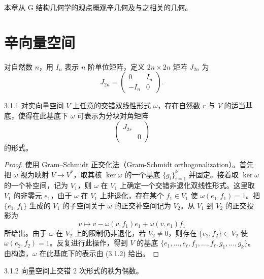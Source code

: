 本章从 G 结构几何学的观点概观辛几何及与之相关的几何。

\section{辛向量空间}

对自然数 $n$，用 $I_n$ 表示 $n$ 阶单位矩阵，定义 $2n\times 2n$ 矩阵 $J_{2n}$ 为
\begin{equation}
  J_{2n}=\begin{pmatrix}0 & I_n\\ -I_n & 0\end{pmatrix}.
  \tag{3.1.1}
\end{equation}

\begin{proposition*}{3.1.1}
  对实向量空间 $V$ 上任意的交错双线性形式 $\omega$，存在自然数 $r$ 与 $V$ 的适当基底，使得在此基底下 $\omega$ 可表示为分块对角矩阵
  \begin{equation}
    \begin{pmatrix} J_{2r} & \\ & 0\end{pmatrix}
    \tag{3.1.2}
  \end{equation}
  的形式。
\end{proposition*}

\begin{proof}
  使用 Gram--Schmidt 正交化法（Gram-Schmidt orthogonalization）。首先把 $\omega$ 视为映射 $V\to V^*$，取其核 $\ker\omega$ 的一个基底 $\{g_i\}_{i=1}^{k}$ 并固定。接着取 $\ker\omega$ 的一个补空间，记为 $V_1$，则 $\omega$ 在 $V_1$ 上确定一个交错非退化双线性形式。这里取 $V_1$ 的非零元 $e_1$，由于 $\omega$ 在 $V_1$ 上非退化，存在某个 $f_1\in V_1$ 使 $\omega(e_1,f_1)=1$。把 $\{e_1,f_1\}$ 生成的 $V_1$ 的子空间关于 $\omega$ 的正交补空间记为 $V_2$。从 $V_1$ 到 $V_2$ 的正交投影为
  \begin{equation}
    v\mapsto v-\omega(v,f_1)e_1+\omega(v,e_1)f_1
    \tag{3.1.3}
  \end{equation}
  所给出。由于 $\omega$ 在 $V_2$ 上的限制仍非退化，若 $V_2\neq 0$，则存在 $\{e_2,f_2\}\subset V_2$ 使 $\omega(e_2,f_2)=1$。反复进行此操作，得到 $V$ 的基底 $\{e_1,\dots,e_\ell,f_1,\dots,f_\ell,g_1,\dots,g_k\}$。由构造，$\omega$ 在此基底下的表示由 (3.1.2) 给出。
\end{proof}

\begin{corollary}{3.1.2}
  向量空间上交错 2 次形式的秩为偶数。
\end{corollary}

